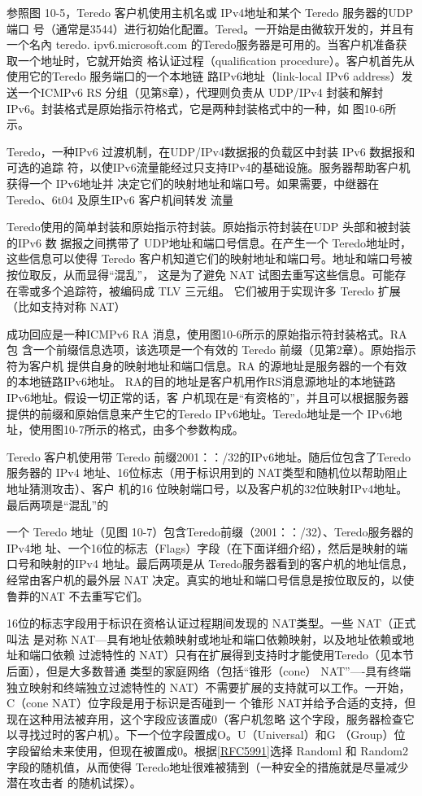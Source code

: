参照图 10-5，Teredo 客户机使用主机名或 IPv4地址和某个 Teredo 服务器的UDP 端口
号（通常是3544）进行初始化配置。Tered。一开始是由微软开发的，并且有一个名內 teredo.
ipv6.microsoft.com 的Teredo服务器是可用的。当客户机准备获取一个地址时，它就开始资
格认证过程（qualification procedure）。客户机首先从使用它的Teredo 服务端口的一个本地链
路IPv6地址（link-local IPv6 address）发送一个ICMPv6 RS 分组（见第8章），代理则负责从
UDP/IPv4 封装和解封IPv6。封装格式是原始指示符格式，它是两种封装格式中的一种，如
图10-6所示。

Teredo，一种IPv6 过渡机制，在UDP/IPv4数据报的负载区中封装 IPv6 数据报和可选的追踪
符，以使IPv6流量能经过只支持IPv4的基础设施。服务器帮助客户机获得一个 IPv6地址并
决定它们的映射地址和端口号。如果需要，中继器在 Teredo、6t04 及原生IPv6 客户机间转发
流量

Teredo使用的简单封装和原始指示符封装。原始指示符封装在UDP 头部和被封装的IPv6 数
据报之间携带了 UDP地址和端口号信息。在产生一个 Teredo地址时，这些信息可以使得
Teredo 客户机知道它们的映射地址和端口号。地址和端口号被按位取反，从而显得“混乱”，
这是为了避免 NAT 试图去重写这些信息。可能存在零或多个追踪符，被编码成 TLV 三元组。
它们被用于实现许多 Teredo 扩展（比如支持对称 NAT）

成功回应是一种ICMPv6 RA 消息，使用图10-6所示的原始指示符封装格式。RA 包
含一个前缀信息选项，该选项是一个有效的 Teredo 前缀（见第2章）。原始指示符为客户机
提供自身的映射地址和端口信息。RA 的源地址是服务器的一个有效的本地链路IPv6地址。
RA的目的地址是客户机用作RS消息源地址的本地链路IPv6地址。假设一切正常的话，客
户机现在是“有资格的”，并且可以根据服务器提供的前缀和原始信息来产生它的Teredo
IPv6地址。Teredo地址是一个 IPv6地址，使用图10-7所示的格式，由多个参数构成。

Teredo 客户机使用带 Teredo 前缀2001：：/32的IPv6地址。随后位包含了Teredo服务器的
IPv4 地址、16位标志（用于标识用到的 NAT类型和随机位以帮助阻止地址猜测攻击）、客户
机的16 位映射端口号，以及客户机的32位映射IPv4地址。最后两项是“混乱”的

一个 Teredo 地址（见图 10-7）包含Teredo前缀（2001：：/32）、Teredo服务器的IPv4地
址、一个16位的标志（Flags）字段（在下面详细介绍），然后是映射的端口号和映射的IPv4
地址。最后两项是从 Teredo服务器看到的客户机的地址信息，经常由客户机的最外层 NAT
决定。真实的地址和端口号信息是按位取反的，以使鲁莽的NAT 不去重写它们。

16位的标志字段用于标识在资格认证过程期间发现的 NAT类型。一些 NAT（正式叫法
是对称 NAT—具有地址依赖映射或地址和端口依赖映射，以及地址依赖或地址和端口依赖
过滤特性的 NAT）只有在扩展得到支持时才能使用Teredo（见本节后面），但是大多数普通
类型的家庭网络（包括“锥形（cone） NAT”—-具有终端独立映射和终端独立过滤特性的
NAT）不需要扩展的支持就可以工作。一开始，C（cone NAT）位字段是用于标识是否碰到一
个锥形 NAT并给予合适的支持，但现在这种用法被弃用，这个字段应该置成0（客户机忽略
这个字段，服务器检查它以寻找过时的客户机）。下一个位字段置成O。U（Universal）和G
（Group）位字段留给未来使用，但现在被置成0。根据\href{https://www.rfc-editor.org/rfc/rfc5991}{[RFC5991]}选择 Randoml 和 Random2
字段的随机值，从而使得 Teredo地址很难被猜到（一种安全的措施就是尽量减少潜在攻击者
的随机试探）。

